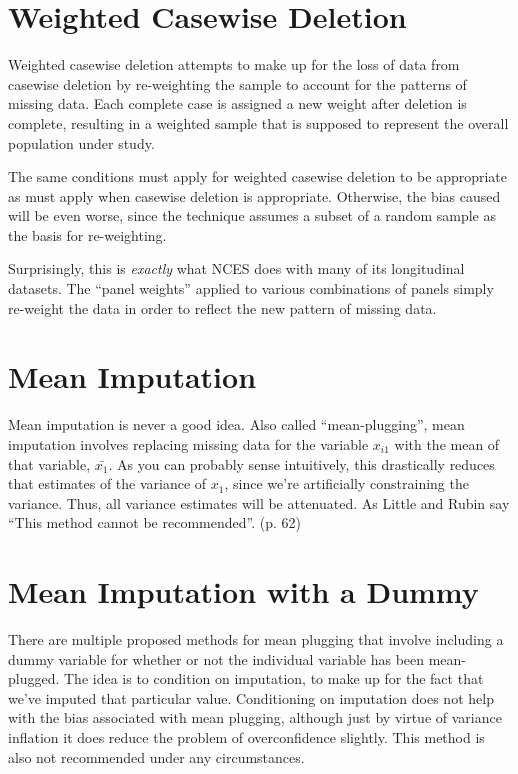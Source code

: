 \documentclass[12 pt]{article}
\begin{document}
\section{Weighted Casewise Deletion}
\label{sec:weight-casew-delat}

Weighted casewise deletion attempts to make up for the loss of data
from casewise deletion by re-weighting the sample to account for the
patterns of missing data. Each complete case is assigned a new weight
after deletion is complete, resulting in a weighted sample that is
supposed to represent the overall population under study. 

The same conditions must apply for weighted casewise deletion to be
appropriate as must apply when casewise deletion is
appropriate. Otherwise, the bias caused will be even worse, since the
technique assumes a subset of a random sample as the basis for
re-weighting. 

Surprisingly, this is \emph{exactly} what NCES does with many of its
longitudinal datasets. The ``panel weights'' applied to various
combinations of panels simply re-weight the data in order to reflect
the new pattern of missing data. 


\section{Mean Imputation}
\label{sec:mean-imputation}

Mean imputation is never a good idea. Also called ``mean-plugging'',
mean imputation involves replacing missing data for the variable
$x_{i1}$ with the mean of that variable, $\bar{x_1}$. As you can
probably sense intuitively, this drastically reduces that estimates of
the variance of $x_1$, since we're artificially constraining the
variance. Thus, all variance estimates will be attenuated. As Little
and Rubin say ``This method cannot be recommended''. (p. 62)


\section{Mean Imputation with a Dummy}
\label{sec:mean-imputation-with}

There are multiple proposed methods for mean plugging that involve
including a dummy variable for whether or not the individual variable
has been mean-plugged. The idea is to condition on imputation, to make
up for the fact that we've imputed that particular value. Conditioning
on imputation does not help with the bias associated with mean
plugging, although just by virtue of variance inflation it does reduce
the problem of overconfidence slightly. This method is also not
recommended under any circumstances. 
\end{document}
